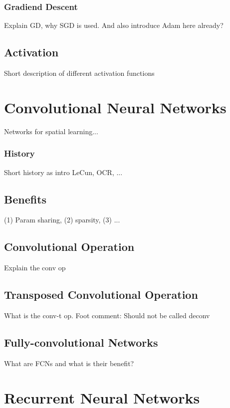\subsubsection{Gradiend Descent}

Explain GD, why SGD is used. And also introduce Adam here already?


\subsection{Activation}

Short description of different activation functions


\section{Convolutional Neural Networks}

Networks for spatial learning...

\subsubsection{History}
Short history as intro LeCun, OCR, ...

\subsection{Benefits}

(1) Param sharing, (2) sparsity, (3) ...

\subsection{Convolutional Operation}

Explain the conv op

\subsection{Transposed Convolutional Operation}

What is the conv-t op. Foot comment: Should not be called deconv

\subsection{Fully-convolutional Networks}

What are FCNs and what is their benefit?


\section{Recurrent Neural Networks}

